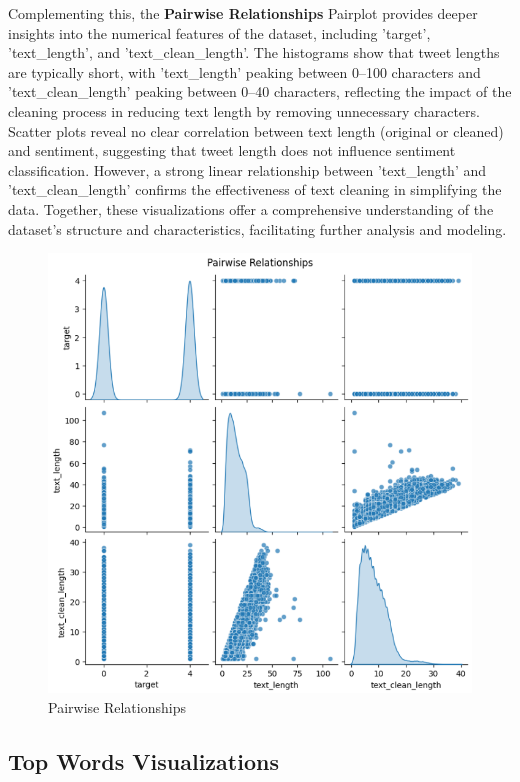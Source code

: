 Complementing this, the \textbf{Pairwise Relationships} Pairplot provides deeper insights into the numerical features of the dataset, including 'target', 'text\_length', and 'text\_clean\_length'. The histograms show that tweet lengths are typically short, with 'text\_length' peaking between 0–100 characters and 'text\_clean\_length' peaking between 0–40 characters, reflecting the impact of the cleaning process in reducing text length by removing unnecessary characters. Scatter plots reveal no clear correlation between text length (original or cleaned) and sentiment, suggesting that tweet length does not influence sentiment classification. However, a strong linear relationship between 'text\_length' and 'text\_clean\_length' confirms the effectiveness of text cleaning in simplifying the data. Together, these visualizations offer a comprehensive understanding of the dataset’s structure and characteristics, facilitating further analysis and modeling.

\begin{figure}[H]
    \centering
    \includegraphics[width=\textwidth]{img/visualize_pic/pairwise.png}
    \caption{Pairwise Relationships}
\end{figure}

\subsection{Top Words Visualizations}

